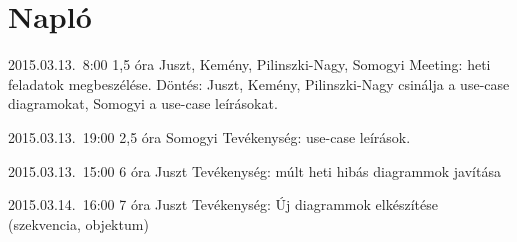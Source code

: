 %
\section{Napló}

\begin{naplo}

\bejegyzes
{2015.03.13.~8:00} %
{1,5 óra} %
{Juszt, Kemény, Pilinszki-Nagy, Somogyi} %
{Meeting: heti feladatok megbeszélése. Döntés: Juszt, Kemény, Pilinszki-Nagy csinálja a use-case diagramokat, Somogyi a use-case leírásokat.} %

\bejegyzes
{2015.03.13.~19:00} %
{2,5 óra} %
{Somogyi} %
{Tevékenység: use-case leírások.} %

\bejegyzes
{2015.03.13.~15:00} %
{6 óra} %
{Juszt} %
{Tevékenység: múlt heti hibás diagrammok javítása} %

\bejegyzes
{2015.03.14.~16:00} %
{7 óra} %
{Juszt} %
{Tevékenység: Új diagrammok elkészítése (szekvencia, objektum)} %

\end{naplo}

